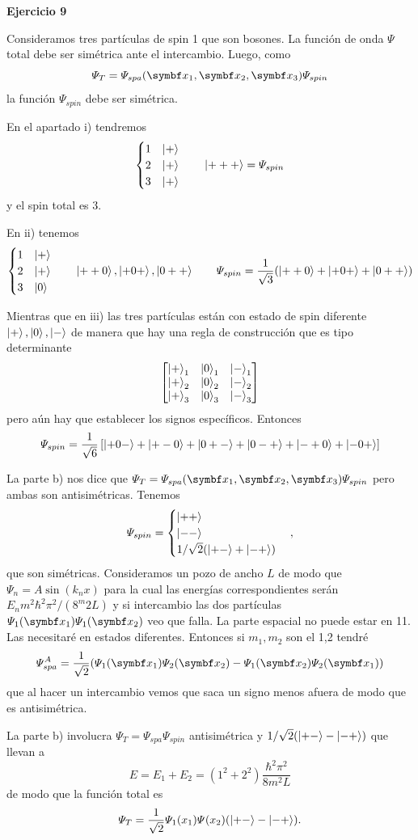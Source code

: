 \documentclass[10pt,oneside]{CBFT_book}
\begin{document}
\begin{ejemplo}{\bf Ejercicio 9}

Consideramos tres partículas de spin 1 que son bosones. La función de onda $\Psi$ total debe ser
simétrica ante el intercambio.
Luego, como
\[
	\Psi_{T} = \Psi_{spa}(\vbx_1, \vbx_2, \vbx_3) \Psi_{spin}
\]
la función $\Psi_{spin}$ debe ser simétrica.

En el apartado i) tendremos
\[
	\begin{cases}
	 1 & \Ket{+} \\
	 2 & \Ket{+} \\
	 3 & \Ket{+} 
	\end{cases}
	\qquad 
	\Ket{+ + +} = \Psi_{spin}
\]
y el spin total es 3.

En ii) tenemos
\[
	\begin{cases}
	 1 & \Ket{+} \\
	 2 & \Ket{+} \\
	 3 & \Ket{0} 
	\end{cases}
	\qquad 
	\Ket{+ + 0}, \Ket{+0+}, \Ket{0++} \qquad 
	\Psi_{spin} = \frac{1}{\sqrt{3}}(\Ket{+ + 0} + \Ket{+0+} + \Ket{0++})
\]

Mientras que en iii) las tres partículas están con estado de spin diferente $\Ket{+}, \Ket{0} ,\Ket{-}$
de manera que hay una regla de construcción que es tipo determinante
\[
	\begin{bmatrix}
	 \Ket{+}_1 & \Ket{0}_1 & \Ket{-}_1 \\
	 \Ket{+}_2 & \Ket{0}_2 & \Ket{-}_2 \\
	 \Ket{+}_3 & \Ket{0}_3 & \Ket{-}_3 
	\end{bmatrix}
\]
pero aún hay que establecer los signos específicos.
Entonces
\[
	\Psi_{spin} = \frac{1}{\sqrt{6}} \left[ 
	\Ket{+ 0 - } + \Ket{+ - 0 } + \Ket{0 + - } + 
	\Ket{0 - +} + \Ket{- + 0} + \Ket{- 0 + }
	\right] 
\]

La parte b) nos dice que $ \Psi_{T} = \Psi_{spa}(\vbx_1, \vbx_2, \vbx_3) \Psi_{spin} $ pero ambas
son antisimétricas. Tenemos
\[
	\Psi_{spin} = \begin{cases}
	 \Ket{+ +} \\
	 \Ket{- -} \\
	 1/\sqrt{2} ( \Ket{+ -} + \Ket{- +} )
	\end{cases},
\]
que son simétricas. Consideramos un pozo de ancho $L$ de modo que $\Psi_n = A \sin( k_n x )$ para la
cual las energías correspondientes serán $E_n m^2 \hbar^2 \pi^2 /( 8^ m2 L )$ y si intercambio las
dos partículas $ \Psi_1(\vbx_1) \Psi_1(\vbx_2) $ veo que falla.
La parte espacial no puede estar en 11. Las necesitaré en estados diferentes. Entonces si $m_1, m_2$
son el 1,2 tendré
\[
	\Psi_{spa}^A = \frac{1}{\sqrt{2}}( \Psi_1(\vbx_1) \Psi_2(\vbx_2) - \Psi_1(\vbx_2) \Psi_2(\vbx_1) )
\]
que al hacer un intercambio vemos que saca un signo menos afuera de modo que es antisimétrica.

La parte b) involucra $ \Psi_T = \Psi_{spa} \Psi_{spin} $ antisimétrica y $1/\sqrt{2}(\Ket{+-} - \Ket{-+})$
que llevan a
\[
	E = E_1 + E_2 = ( 1^2 + 2^2 ) \frac{\hbar^2 \pi^2 }{ 8 m^2 L}
\]
de modo que la función total es
\[
	\Psi_T = \frac{1}{\sqrt{2}} \Psi_1(x_1) \Psi(x_2)( \Ket{+-} - \Ket{-+}).
\]

\end{ejemplo}



\end{document}
